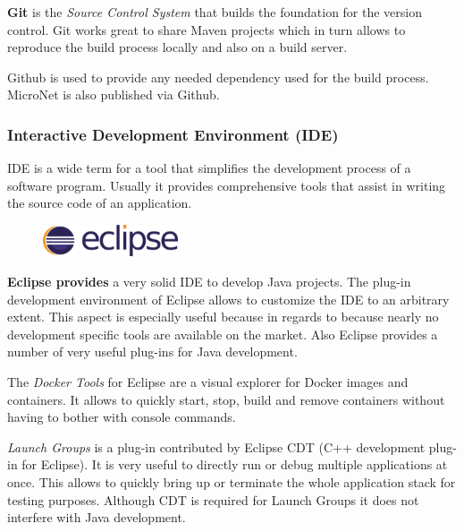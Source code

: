 \textbf{Git} is the \textit{Source Control System} that builds the foundation
for the version control. Git works great to share Maven projects which in turn
allows to reproduce the build process locally and also on a build server.

Github is used to provide any needed dependency used for the build process.
MicroNet is also published via Github.

\subsubsection{Interactive Development Environment (IDE)}

IDE is a wide term for a tool that simplifies the development process of a
software program. Usually it provides comprehensive tools that assist in writing
the source code of an application.\\

\begin{figure}
    \includegraphics[width=4cm]{images/dependencies/eclipse}
\end{figure}

\textbf{Eclipse provides} a very solid IDE to develop Java projects. The plug-in
development environment of Eclipse allows to customize the IDE to an arbitrary
extent. This aspect is especially useful because in regards to \mss{} because
nearly no \ms{} development specific tools are available on the market. Also
Eclipse provides a number of very useful plug-ins for Java development.

The \textit{Docker Tools} for Eclipse are a visual explorer  for Docker images
and containers. It allows to quickly start, stop, build and remove containers
without having to bother with console commands.

\textit{Launch Groups} is a plug-in contributed by Eclipse CDT (C++ development
plug-in for Eclipse). It is very useful to directly run or debug multiple
applications at once. This allows to quickly bring up or terminate the whole
application stack for testing purposes. Although CDT is required for Launch
Groups it does not interfere with Java development.
































